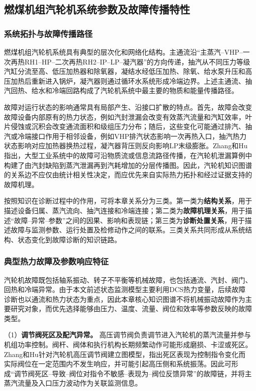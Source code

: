 \subsection{燃煤机组汽轮机系统参数及故障传播特性}
\label{subsec:turbine_fault_characteristics_v2}

\subsubsection{系统拓扑与故障传播路径}

燃煤机组汽轮机系统具有典型的层次化和网络化结构。主通流沿“主蒸汽--VHP--一次再热RH1--HP--二次再热RH2--IP--LP--凝汽器”的方向传递，抽汽从不同压力等级汽缸分流至高、低压加热器和除氧器，凝结水经低压加热、除氧、给水泵升压和高压加热后重新进入锅炉，凝汽器则通过循环水系统形成冷端边界。上述主通流、抽汽回热、给水和冷端回路构成了汽轮机系统中最主要的物质和能量传播路径。

故障对运行状态的影响通常具有局部产生、沿接口扩散的特点。首先，故障会改变故障设备内部原有的热力状态，例如汽封泄漏会改变有效蒸汽流量和汽缸效率，叶片侵蚀或沉积会改变通流面积和级组压力分布；随后，这些变化可能通过排汽、抽汽或冷端接口作用于相邻设备，例如VHP排汽状态影响一次再热入口，抽汽热力状态影响对应加热器换热过程，凝汽器背压则反向影响LP末级膨胀。Zhang和Hu指出，大型工业系统中的故障可沿物质流或信息流路径传播，在汽轮机泄漏算例中构建了由汽封缺陷到蒸汽泄漏再到汽耗增加的分层传播图\cite{ZhangHu2021FaultPropagationGNN}。因此，汽轮机知识图谱的关系边不应仅由统计相关性决定，而应优先来自实际热力拓扑和经过证据支持的故障机理。

按照知识在诊断过程中的作用，可将本章关系分为三类。第一类为\textbf{结构关系}，用于描述设备归属、蒸汽流向、抽汽连接和冷端连接；第二类为\textbf{故障机理关系}，用于描述“故障--异常--参数”之间的因果、影响和表现链；第三类为\textbf{诊断处置关系}，用于描述故障与监测参数、运行处置及检修动作之间的联系。三类关系共同形成从系统结构、状态变化到故障诊断的知识链路。

\subsubsection{典型热力故障及参数响应特征}

汽轮机故障既包括轴系振动、转子不平衡等机械故障，也包括通流、汽封、阀门、回热和冷端异常。由于本文前述状态监测模型主要利用DCS热力变量，后续故障诊断也以通流和热力状态为重点，因此本章核心知识图谱不将机械振动故障作为主要研究对象，而优先选择能够由压力、温度、流量、阀位和效率等参数反映的故障类型。

（1）\textbf{调节阀死区及配汽异常。} 高压调节阀负责调节进入汽轮机的蒸汽流量并参与机组功率控制。阀杆、阀体和执行机构长期频繁动作可能形成磨损、卡涩或死区。Zhang和Hu针对汽轮机高压调节阀建立图模型，指出死区表现为控制指令变化而实际阀位在一定范围内不发生响应，并可能引起高压侧和系统振荡\cite{ZhangHu2021ControlValveGraph}。因此可形成“调节阀死区--导致--阀位对指令不敏感--表现为--阀位反馈异常”的故障链，并将主蒸汽流量及入口压力波动作为关联监测信息。

